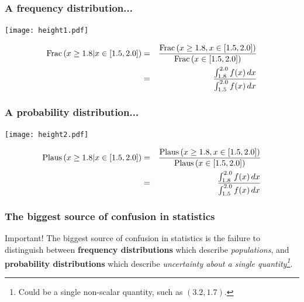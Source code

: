 \documentclass{beamer}
\begin{document}
\begin{frame}
\frametitle{A frequency distribution...}

\centering
\texttt{[image: height1.pdf]}

\begin{eqnarray*}
\textnormal{Frac}\left(x \geq 1.8 | x \in [1.5, 2.0]\right)
&=& 
\frac{\textnormal{Frac}\left(x \geq 1.8, x \in [1.5, 2.0]\right)}
{\textnormal{Frac}\left(x \in [1.5, 2.0]\right)}\\
&=& \frac{\int_{1.8}^{2.0} f(x) \, dx}{\int_{1.5}^{2.0} f(x) \, dx}
\end{eqnarray*}

\end{frame}


\begin{frame}
\frametitle{A probability distribution...}

\centering
\texttt{[image: height2.pdf]}

\begin{eqnarray*}
\textnormal{Plaus}\left(x \geq 1.8 | x \in [1.5, 2.0]\right)
&=& 
\frac{\textnormal{Plaus}\left(x \geq 1.8, x \in [1.5, 2.0]\right)}
{\textnormal{Plaus}\left(x \in [1.5, 2.0]\right)}\\
&=& \frac{\int_{1.8}^{2.0} f(x) \, dx}{\int_{1.5}^{2.0} f(x) \, dx}
\end{eqnarray*}

\end{frame}


\begin{frame}
\frametitle{The biggest source of confusion in statistics}

\begin{alertblock}{Important!}
The biggest source of confusion in statistics is the failure to
distinguish between {\bf frequency distributions} which describe
{\em populations}, and {\bf probability distributions} which describe
{\em uncertainty about a single quantity\footnote{Could be a single
non-scalar quantity, such as $(3.2, 1.7)$.}}.
\end{alertblock}

\end{frame}
\end{document}

